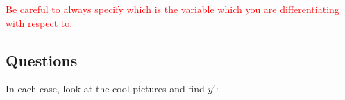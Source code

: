 \textcolor{red}{Be careful to always specify which is the variable which you are differentiating with respect to.}

\clearpage
\subsection*{Questions}
\begin{questions}
  \questioM In each case, look at the cool pictures and find $ y' $:
    \begin{multicols}{2}
\end{multicols}
\end{questions}
